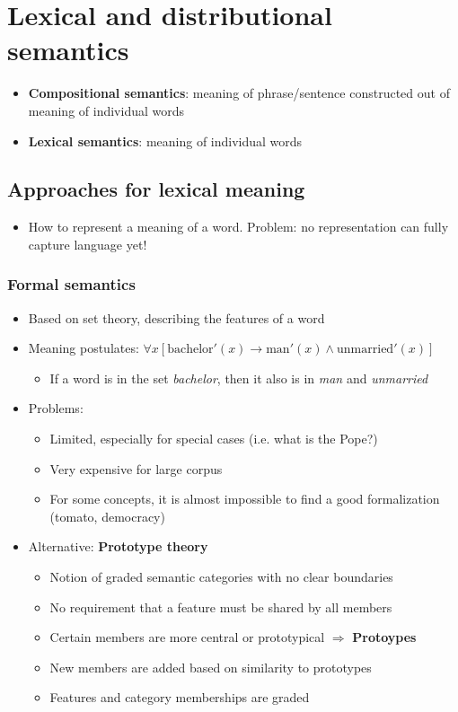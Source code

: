 \section{Lexical and distributional semantics}
\begin{itemize}
	\item \textbf{Compositional semantics}: meaning of phrase/sentence constructed out of meaning of individual words
	\item \textbf{Lexical semantics}: meaning of individual words
\end{itemize}
\subsection{Approaches for lexical meaning}
\begin{itemize}
	\item How to represent a meaning of a word. Problem: no representation can fully capture language yet!
\end{itemize}
\subsubsection{Formal semantics}
\begin{itemize}
	\item Based on set theory, describing the features of a word
	\item Meaning postulates: $\forall x \left[\text{bachelor}'(x)\to\text{man}'(x)\wedge\text{unmarried}'(x)\right]$
	\begin{itemize}
		\item If a word is in the set \textit{bachelor}, then it also is in \textit{man} and \textit{unmarried}
	\end{itemize}
	\item Problems:
	\begin{itemize}
		\item Limited, especially for special cases (i.e. what is the Pope?)
		\item Very expensive for large corpus
		\item For some concepts, it is almost impossible to find a good formalization (tomato, democracy)
	\end{itemize}
	\item Alternative: \textbf{Prototype theory}
	\begin{itemize}
		\item Notion of graded semantic categories with no clear boundaries
		\item No requirement that a feature must be shared by all members
		\item Certain members are more central or prototypical $\Rightarrow$ \textbf{Protoypes}
		\item New members are added based on similarity to prototypes
		\item Features and category memberships are graded
	\end{itemize}
\end{itemize}
